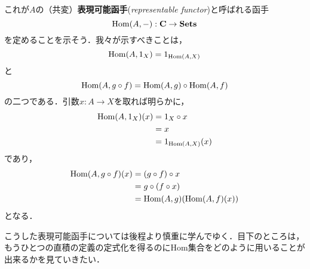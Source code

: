 これが$A$の（共変）{\bfseries 表現可能函手}({\itshape representable
functor})と呼ばれる函手
\[
 \mathrm{Hom}(A, -): {\bf C} \to \mathbf{Sets}
\]
を定めることを示そう．我々が示すべきことは，
\[
 \mathrm{Hom}(A, 1_{X}) = 1_{\mathrm{Hom}(A, X)}
\]
と
\[
 \mathrm{Hom}(A, g \circ f) = \mathrm{Hom}(A, g) \circ \mathrm{Hom}(A, f)
\]
の二つである．引数$x: A \to X$を取れば明らかに，
\begin{align*}
 \mathrm{Hom}(A, 1_X)(x) &= 1_X \circ x\\
                 &= x\\
                 &= 1_{\mathrm{Hom}(A, X)}(x)
\end{align*}
であり，
\begin{align*}
 \mathrm{Hom}(A, g \circ f)(x) &= (g \circ f) \circ x\\
                       &= g \circ (f \circ x)\\
                       &= \mathrm{Hom}(A, g)(\mathrm{Hom}(A, f)(x))
\end{align*}
となる．

こうした表現可能函手については後程より慎重に学んでゆく．目下のところは，
もうひとつの直積の定義の定式化を得るのにHom集合をどのように用いることが
出来るかを見ていきたい．

